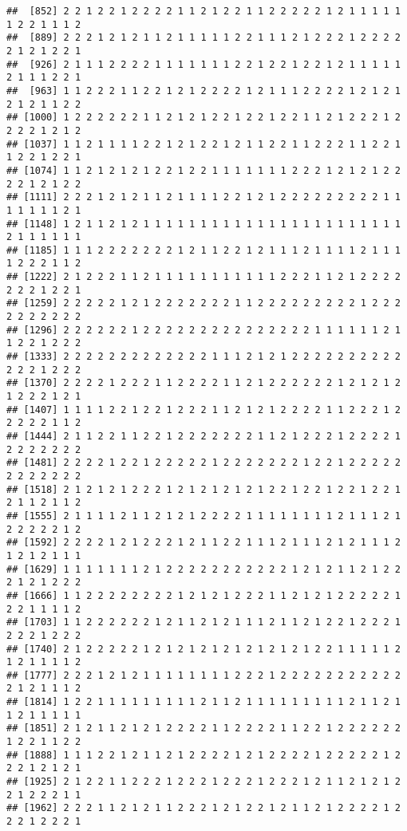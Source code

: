 \documentclass[
]{article}
\begin{document}
\begin{verbatim}
##  [852] 2 2 1 2 2 1 2 2 2 2 1 1 2 1 2 2 1 1 2 2 2 2 2 1 2 1 1 1 1 1 1 2 2 1 1 1 2
##  [889] 2 2 2 1 2 1 2 1 1 2 1 1 1 1 1 2 2 1 1 1 2 1 2 2 2 1 2 2 2 2 2 1 2 1 2 2 1
##  [926] 2 1 1 1 2 2 2 2 1 1 1 1 1 1 1 2 2 1 2 2 1 2 2 1 2 1 1 1 1 1 2 1 1 1 2 2 1
##  [963] 1 1 2 2 2 1 1 2 2 1 2 1 2 2 2 2 1 2 1 1 1 2 2 2 2 1 2 1 2 1 2 1 2 1 1 2 2
## [1000] 1 2 2 2 2 2 2 1 1 2 1 2 1 2 2 1 2 2 1 2 2 1 1 2 1 2 2 2 1 2 2 2 2 1 2 1 2
## [1037] 1 1 2 1 1 1 1 2 2 1 2 1 2 2 1 2 1 1 2 2 1 1 2 2 2 1 1 2 2 1 1 2 2 1 2 2 1
## [1074] 1 1 2 1 2 1 2 1 2 2 1 2 2 1 1 1 1 1 1 1 2 2 2 1 2 1 2 1 2 2 2 2 1 2 1 2 2
## [1111] 2 2 2 1 2 1 2 1 1 2 1 1 1 1 2 2 1 2 1 2 2 2 2 2 2 2 2 2 1 1 1 1 1 1 1 2 1
## [1148] 1 2 1 1 2 1 2 1 1 1 1 1 1 1 1 1 1 1 1 1 1 1 1 1 1 1 1 1 1 1 2 1 1 1 1 1 1
## [1185] 1 1 1 2 2 2 2 2 2 2 1 2 1 1 2 2 1 2 1 1 1 2 1 1 1 1 2 1 1 1 1 2 2 2 1 1 2
## [1222] 2 1 2 2 2 1 1 2 1 1 1 1 1 1 1 1 1 1 1 2 2 2 1 1 2 1 2 2 2 2 2 2 2 1 2 2 1
## [1259] 2 2 2 2 2 1 2 1 2 2 2 2 2 2 2 1 1 2 2 2 2 2 2 2 2 2 1 2 2 2 2 2 2 2 2 2 2
## [1296] 2 2 2 2 2 2 1 2 2 2 2 2 2 2 2 2 2 2 2 2 2 2 1 1 1 1 1 1 2 1 1 2 2 1 2 2 2
## [1333] 2 2 2 2 2 2 2 2 2 2 2 2 2 1 1 1 2 1 2 1 2 2 2 2 2 2 2 2 2 2 2 2 2 1 2 2 2
## [1370] 2 2 2 2 1 2 2 2 1 1 2 2 2 2 1 1 2 1 2 2 2 2 2 2 1 2 1 2 1 2 1 2 2 2 1 2 1
## [1407] 1 1 1 1 2 2 1 2 2 1 2 2 2 1 1 2 1 2 1 2 2 2 2 1 1 2 2 2 1 2 2 2 2 2 1 1 2
## [1444] 2 1 1 2 2 1 1 2 2 1 2 2 2 2 2 2 2 1 1 2 1 2 2 2 1 2 2 2 2 1 2 2 2 2 2 2 2
## [1481] 2 2 2 2 1 2 2 1 2 2 2 2 2 1 2 2 2 2 2 2 2 1 2 2 1 2 2 2 2 2 2 2 2 2 2 2 2
## [1518] 2 1 2 1 2 1 2 2 2 1 2 1 2 1 2 1 2 1 2 2 1 2 2 1 2 2 1 2 2 1 2 1 1 2 1 1 2
## [1555] 2 1 1 1 1 2 1 1 2 1 2 1 2 2 2 2 1 1 1 1 1 1 1 1 2 1 1 1 2 1 2 2 2 2 2 1 2
## [1592] 2 2 2 2 1 2 1 2 2 2 1 2 1 1 2 2 1 1 1 2 1 1 1 2 1 2 1 1 1 2 1 2 1 2 1 1 1
## [1629] 1 1 1 1 1 1 1 2 1 2 2 2 2 2 2 2 2 2 2 2 1 2 1 2 1 1 2 1 2 2 2 1 2 1 2 2 2
## [1666] 1 1 2 2 2 2 2 2 2 2 1 2 1 2 1 2 2 2 1 1 2 1 2 1 2 2 2 2 2 1 2 2 1 1 1 1 2
## [1703] 1 1 2 2 2 2 2 2 1 2 1 1 2 1 2 1 1 1 2 1 1 2 1 2 2 1 2 2 2 1 2 2 2 1 2 2 2
## [1740] 2 1 2 2 2 2 2 1 2 1 2 1 2 1 2 1 2 1 2 1 2 1 2 2 1 1 1 1 1 2 1 2 1 1 1 1 2
## [1777] 2 2 2 1 2 1 2 1 1 1 1 1 1 1 1 2 2 2 1 2 2 2 2 2 2 2 2 2 2 2 2 1 2 1 1 1 2
## [1814] 1 2 2 1 1 1 1 1 1 1 1 1 2 1 1 2 1 1 1 1 1 1 1 1 1 2 1 1 2 1 1 2 1 1 1 1 1
## [1851] 2 1 2 1 1 2 1 2 1 2 2 2 2 1 1 2 2 2 2 1 1 2 2 1 2 2 2 2 2 2 1 2 2 1 1 2 2
## [1888] 1 1 1 2 2 1 2 1 1 2 1 2 2 2 2 1 2 1 2 2 2 2 1 2 2 2 2 2 1 2 2 2 1 2 1 2 1
## [1925] 2 1 2 2 1 1 2 2 2 1 2 2 2 1 2 2 2 1 2 2 2 1 2 1 1 2 1 2 1 2 2 1 2 2 2 1 1
## [1962] 2 2 2 1 1 2 1 2 1 1 2 2 2 1 2 1 2 2 1 2 1 1 2 1 2 2 2 2 1 2 2 2 1 2 2 2 1

\end{verbatim}
\end{document}
